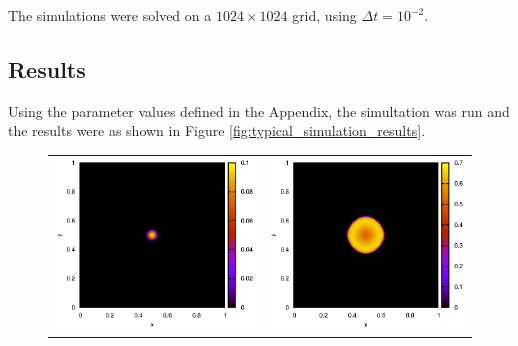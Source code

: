 \documentclass{article}
\theoremstyle{plain}
\begin{document}
    The simulations were solved on a $1024 \times 1024$ grid, using $\Delta t = 10^{-2}$.
     
  
  \subsection{Results}
    Using the parameter values defined in the Appendix, the simultation was run and the results were as shown in Figure \ref{fig:typical_simulation_results}.

    \begin{figure}[h!tb]
      \begin{center}
      \begin{tabular}{c c}
        \includegraphics[scale = 0.5]{typicalSim-t0.eps}&
        \includegraphics[scale = 0.5]{typicalSim-t10.eps}\\

\end{tabular}
\end{center}
\end{figure}
\end{document}
